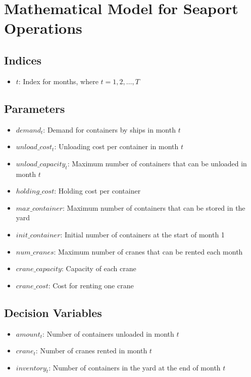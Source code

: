 \documentclass{article}
\begin{document}
\section*{Mathematical Model for Seaport Operations}

\subsection*{Indices}
\begin{itemize}
    \item $t$: Index for months, where $t = 1, 2, \ldots, T$
\end{itemize}

\subsection*{Parameters}
\begin{itemize}
    \item $demand_{t}$: Demand for containers by ships in month $t$
    \item $unload\_cost_{t}$: Unloading cost per container in month $t$
    \item $unload\_capacity_{t}$: Maximum number of containers that can be unloaded in month $t$
    \item $holding\_cost$: Holding cost per container
    \item $max\_container$: Maximum number of containers that can be stored in the yard
    \item $init\_container$: Initial number of containers at the start of month 1
    \item $num\_cranes$: Maximum number of cranes that can be rented each month
    \item $crane\_capacity$: Capacity of each crane
    \item $crane\_cost$: Cost for renting one crane
\end{itemize}

\subsection*{Decision Variables}
\begin{itemize}
    \item $amount_{t}$: Number of containers unloaded in month $t$
    \item $crane_{t}$: Number of cranes rented in month $t$
    \item $inventory_{t}$: Number of containers in the yard at the end of month $t$
\end{itemize}
\end{document}
